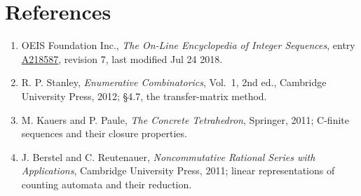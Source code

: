 \documentclass[11pt]{article}
\theoremstyle{definition}
\begin{document}
\section{References}

\begin{enumerate}

\item OEIS Foundation Inc., \emph{The On-Line Encyclopedia of Integer Sequences}, entry \href{https://oeis.org/A218587}{A218587}, revision 7, last modified Jul 24 2018.

\item R. P. Stanley, \emph{Enumerative Combinatorics}, Vol.~1, 2nd ed., Cambridge University Press, 2012; \S4.7, the transfer-matrix method.

\item M. Kauers and P. Paule, \emph{The Concrete Tetrahedron}, Springer, 2011; C-finite sequences and their closure properties.

\item J. Berstel and C. Reutenauer, \emph{Noncommutative Rational Series with Applications}, Cambridge University Press, 2011; linear representations of counting automata and their reduction.

\end{enumerate}
\end{document}
